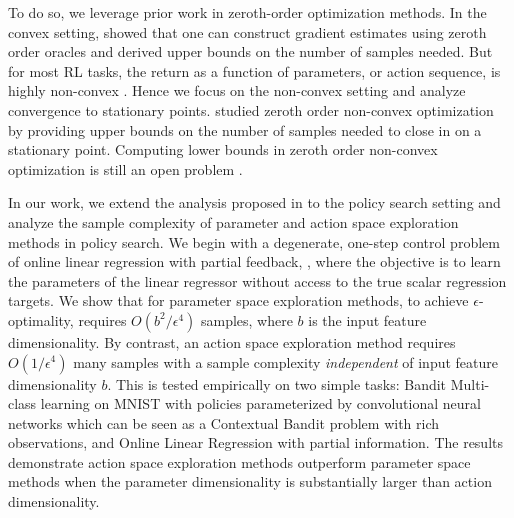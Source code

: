 To do so, we leverage prior work in zeroth-order
optimization methods. In the convex setting, 
\citep{flaxman2005online, agarwal2010optimal, nesterov2017random}
showed that one can construct %
gradient %
estimates using zeroth order oracles and derived upper bounds on the
number of samples needed. 
%
%
%
But for most RL tasks,
the return as a function of parameters, or action sequence, is highly
non-convex \citep{sutton1998introduction}. Hence we focus on the non-convex setting and analyze convergence to stationary points. \cite{ghadimi2013stochastic, nesterov2017random} studied zeroth order
non-convex optimization by providing upper bounds on
the number of samples needed to close in on a stationary
point. Computing lower bounds in zeroth order non-convex optimization is still
an open problem %
%
\citep{carmon2017lower, carmon2017lower2}. 

In our work, we extend the analysis proposed in \citep{ghadimi2013stochastic} to the policy search setting 
%
%
and analyze the sample complexity of parameter and action space exploration methods in policy search. We begin with a degenerate, one-step control problem of online linear regression with partial feedback, \citep{flaxman2005online}, where the objective is to learn the parameters of the linear regressor without access to the true scalar regression targets. We show that for parameter space exploration methods, to achieve $\epsilon$-optimality, requires $O(b^2/\epsilon^4)$ samples, 
%
where $b$ is the input feature dimensionality. By contrast, an action space exploration method requires $O(1/\epsilon^4)$ many samples
%
with a sample complexity \textit{independent} of input feature dimensionality $b$. %
This is tested empirically on two simple tasks:  Bandit Multi-class learning on MNIST with policies parameterized by convolutional neural networks which can be seen as a Contextual Bandit problem with rich observations, and Online Linear Regression with partial information. The results demonstrate action space exploration methods outperform  parameter space methods when the parameter dimensionality is substantially larger than action dimensionality.

